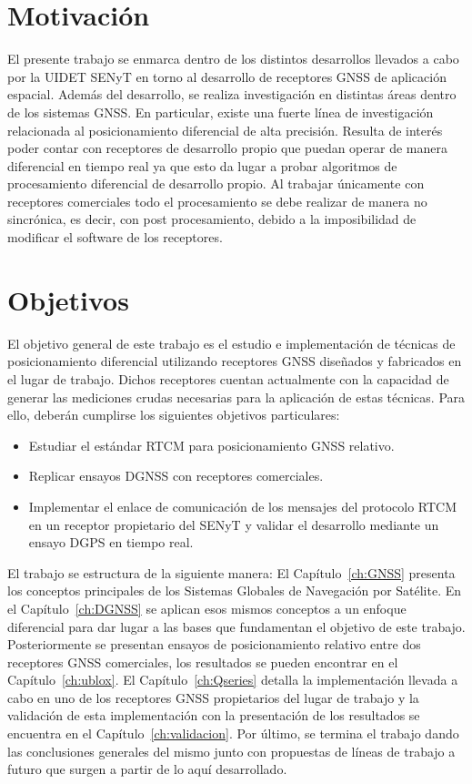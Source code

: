 \documentclass[a4paper,12pt,oneside,onecolumn,final,openright]{book}%
\begin{document}
\section*{Motivación}
	El presente trabajo se enmarca dentro de los distintos desarrollos llevados a cabo por la UIDET SENyT en torno al desarrollo de receptores GNSS de aplicación espacial. Además del desarrollo, se realiza investigación en distintas áreas dentro de los sistemas GNSS. En particular, existe una fuerte línea de investigación relacionada al posicionamiento diferencial de alta precisión. Resulta de interés poder contar con receptores de desarrollo propio que puedan operar de manera diferencial en tiempo real ya que esto da lugar a probar algoritmos de procesamiento diferencial de desarrollo propio. Al trabajar únicamente con receptores comerciales todo el procesamiento se debe realizar de manera no sincrónica, es decir, con post procesamiento, debido a la imposibilidad de modificar el software de los receptores.
\section*{Objetivos}
	El objetivo general de este trabajo es el estudio e implementación de técnicas de posicionamiento diferencial utilizando receptores GNSS diseñados y fabricados en el lugar de trabajo. Dichos receptores cuentan actualmente con la capacidad de generar las mediciones crudas necesarias para la aplicación de estas técnicas. Para ello, deberán cumplirse los siguientes objetivos particulares:
\begin{itemize}
	\item Estudiar el estándar RTCM para posicionamiento GNSS relativo.
	\item Replicar ensayos DGNSS con receptores comerciales.
	\item Implementar el enlace de comunicación de los mensajes del protocolo RTCM en un receptor propietario del SENyT y validar el desarrollo mediante un ensayo DGPS en tiempo real.
\end{itemize}	

	El trabajo se estructura de la siguiente manera: El Capítulo~\ref{ch:GNSS} presenta los conceptos principales de los Sistemas Globales de Navegación por Satélite. En el Capítulo~\ref{ch:DGNSS} se aplican esos mismos conceptos a un enfoque diferencial para dar lugar a las bases que fundamentan el objetivo de este trabajo. Posteriormente se presentan ensayos de posicionamiento relativo entre dos receptores GNSS comerciales, los resultados se pueden encontrar en el Capítulo~\ref{ch:ublox}. El Capítulo~\ref{ch:Qseries} detalla la implementación llevada a cabo en uno de los receptores GNSS propietarios del lugar de trabajo y la validación de esta implementación con la presentación de los resultados se encuentra en el Capítulo~\ref{ch:validacion}. Por último, se termina el trabajo dando las conclusiones generales del mismo junto con propuestas de líneas de trabajo a futuro que surgen a partir de lo aquí desarrollado.
\end{document}
